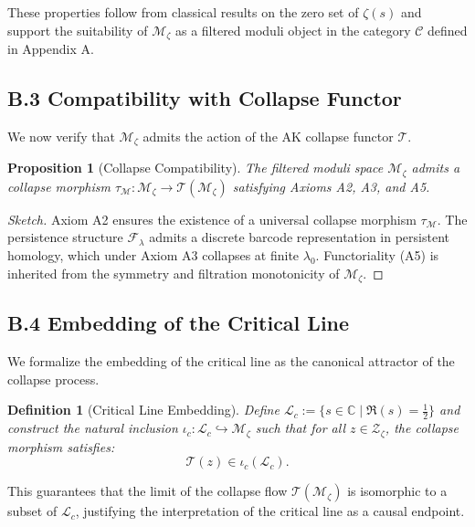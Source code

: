 \documentclass[11pt]{article}
\newtheorem{definition}[theorem]{Definition}
\newtheorem{proposition}[theorem]{Proposition}
\begin{document}
These properties follow from classical results on the zero set of $\zeta(s)$ and support the suitability of $\mathcal{M}_\zeta$  
as a filtered moduli object in the category $\mathcal{C}$ defined in Appendix A.

\subsection*{B.3 Compatibility with Collapse Functor}

We now verify that $\mathcal{M}_\zeta$ admits the action of the AK collapse functor $\mathcal{T}$.

\begin{proposition}[Collapse Compatibility]
The filtered moduli space $\mathcal{M}_\zeta$ admits a collapse morphism $\tau_{\mathcal{M}} : \mathcal{M}_\zeta \to \mathcal{T}(\mathcal{M}_\zeta)$  
satisfying Axioms A2, A3, and A5.
\end{proposition}

\begin{proof}[Sketch]
Axiom A2 ensures the existence of a universal collapse morphism $\tau_{\mathcal{M}}$.  
The persistence structure $\mathcal{F}_\lambda$ admits a discrete barcode representation in persistent homology,  
which under Axiom A3 collapses at finite $\lambda_0$.  
Functoriality (A5) is inherited from the symmetry and filtration monotonicity of $\mathcal{M}_\zeta$.
\end{proof}

\subsection*{B.4 Embedding of the Critical Line}

We formalize the embedding of the critical line as the canonical attractor of the collapse process.

\begin{definition}[Critical Line Embedding]
Define $\mathcal{L}_c := \{ s \in \mathbb{C} \mid \Re(s) = \tfrac{1}{2} \}$ and  
construct the natural inclusion $\iota_c : \mathcal{L}_c \hookrightarrow \mathcal{M}_\zeta$  
such that for all $z \in \mathcal{Z}_\zeta$, the collapse morphism satisfies:
\[
\mathcal{T}(z) \in \iota_c(\mathcal{L}_c).
\]
\end{definition}

This guarantees that the limit of the collapse flow $\mathcal{T}(\mathcal{M}_\zeta)$  
is isomorphic to a subset of $\mathcal{L}_c$, justifying the interpretation of the critical line as a causal endpoint.
\end{document}
